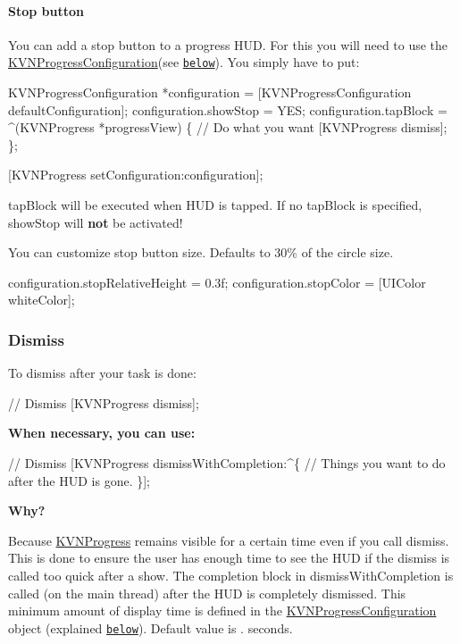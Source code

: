 \paragraph*{Stop button}

You can add a stop button to a progress H\+UD. For this you will need to use the {\ttfamily \mbox{\hyperlink{interface_k_v_n_progress_configuration}{K\+V\+N\+Progress\+Configuration}}}(see \href{#KVNProgressConfiguration}{\tt below}). You simply have to put\+:


\begin{DoxyCode}
KVNProgressConfiguration *configuration = [KVNProgressConfiguration defaultConfiguration];
configuration.showStop = YES;
configuration.tapBlock = ^(KVNProgress *progressView) \{
    // Do what you want
    [KVNProgress dismiss];
\};

[KVNProgress setConfiguration:configuration];
\end{DoxyCode}


{\ttfamily tap\+Block} will be executed when H\+UD is tapped. If no {\ttfamily tap\+Block} is specified, {\ttfamily show\+Stop} will {\bfseries not} be activated!

You can customize stop button size. Defaults to 30\% of the circle size.


\begin{DoxyCode}
configuration.stopRelativeHeight = 0.3f;
configuration.stopColor = [UIColor whiteColor];
\end{DoxyCode}


\subsubsection*{Dismiss}

To dismiss after your task is done\+:


\begin{DoxyCode}
// Dismiss
[KVNProgress dismiss];
\end{DoxyCode}


{\bfseries When necessary, you can use\+:}


\begin{DoxyCode}
// Dismiss
[KVNProgress dismissWithCompletion:^\{
   // Things you want to do after the HUD is gone.
\}];
\end{DoxyCode}


{\bfseries Why?}

Because \mbox{\hyperlink{interface_k_v_n_progress}{K\+V\+N\+Progress}} remains visible for a certain time even if you call {\ttfamily dismiss}. This is done to ensure the user has enough time to see the H\+UD if the {\ttfamily dismiss} is called too quick after a {\ttfamily show}. The completion block in {\ttfamily dismiss\+With\+Completion} is called (on the main thread) after the H\+UD is completely dismissed. This minimum amount of display time is defined in the \mbox{\hyperlink{interface_k_v_n_progress_configuration}{K\+V\+N\+Progress\+Configuration}} object (explained \href{#display-times}{\tt below}). Default value is {.} seconds.

